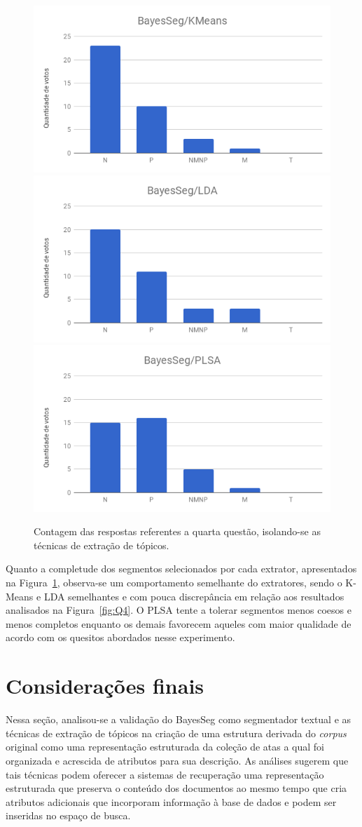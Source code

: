 \begin{figure}[!h] \centering     %

		\includegraphics[width=.31\textwidth]{conteudo/capitulos/figs/figuras-experimento/t1q4.png}
		\includegraphics[width=.31\textwidth]{conteudo/capitulos/figs/figuras-experimento/t2q4.png}
		\includegraphics[width=.31\textwidth]{conteudo/capitulos/figs/figuras-experimento/t3q4.png}

	\caption{Contagem das respostas referentes a quarta questão, isolando-se as técnicas de extração de tópicos.}
	\label{fig:influenciaExtSegQ4}
\end{figure}


Quanto a completude dos segmentos selecionados por cada extrator, apresentados na Figura~\ref{fig:influenciaExtSegQ4}, observa-se um comportamento semelhante do extratores, sendo o K-Means e LDA semelhantes e com pouca discrepância em relação aos resultados analisados na Figura~\ref{fig:Q4}. O PLSA tente a tolerar segmentos menos coesos e menos completos enquanto os demais favorecem aqueles com maior qualidade de acordo com os quesitos abordados nesse experimento.




\section{Considerações finais}

Nessa seção, analisou-se a validação do BayesSeg como segmentador textual e as técnicas de extração de tópicos na criação de uma estrutura derivada do \textit{corpus} original como uma representação estruturada da coleção de atas a qual foi organizada e acrescida de atributos para sua descrição. As análises sugerem que tais técnicas podem oferecer a sistemas de recuperação uma representação estruturada que preserva o conteúdo dos documentos ao mesmo tempo que cria atributos adicionais que incorporam informação à base de dados e podem ser inseridas no espaço de busca.  

